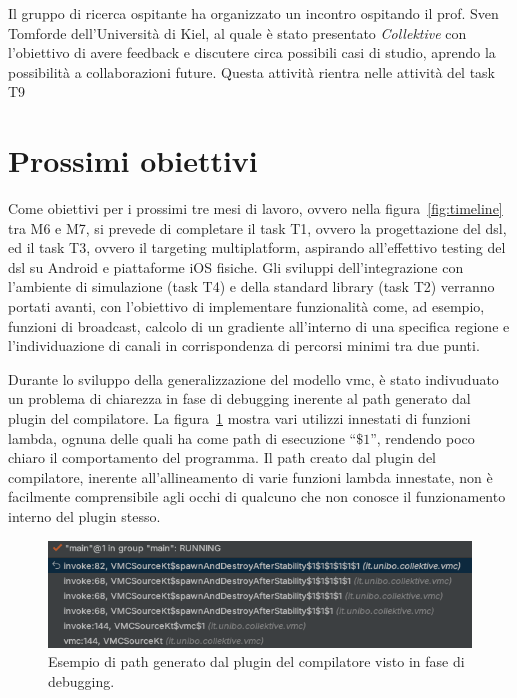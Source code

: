 \documentclass[13pt, a4paper]{article}
\newcommand{\ck}{\emph{Collektive}}
\begin{document}
Il gruppo di ricerca ospitante ha organizzato un incontro ospitando il prof. Sven Tomforde dell'Università di Kiel,
al quale è stato presentato \ck{} con l'obiettivo di avere feedback e discutere circa possibili casi di studio, aprendo la possibilità a collaborazioni future.
%
Questa attività rientra nelle attività del task T9

\section{Prossimi obiettivi}\label{sec:prossimi-obiettivi}

Come obiettivi per i prossimi tre mesi di lavoro, ovvero nella figura~\ref{fig:timeline} tra M6 e M7,
    si prevede di completare il task T1, ovvero la progettazione del \ac{dsl},
    ed il task T3, ovvero il targeting multiplatform,
    aspirando all'effettivo testing del \ac{dsl} su Android e piattaforme iOS fisiche.
%
Gli sviluppi dell'integrazione con l'ambiente di simulazione (task T4) e della standard library (task T2) verranno portati
avanti, con l'obiettivo di implementare funzionalità come, ad esempio, funzioni di broadcast,
calcolo di un gradiente all'interno di una specifica regione e l'individuazione di canali in corrispondenza di percorsi minimi tra due punti.

Durante lo sviluppo della generalizzazione del modello \ac{vmc}, è stato indivuduato un problema di chiarezza in fase di debugging
inerente al path generato dal plugin del compilatore.
%
La figura~\ref{fig:alignment} mostra vari utilizzi innestati di funzioni lambda, ognuna delle quali ha come path di esecuzione
``$\$1$'', rendendo poco chiaro il comportamento del programma.
%
Il path creato dal plugin del compilatore, inerente all'allineamento di varie funzioni lambda innestate, non è facilmente comprensibile
agli occhi di qualcuno che non conosce il funzionamento interno del plugin stesso.
\begin{figure}
    \centering
    \includegraphics[width=\textwidth]{images/alignment}
    \caption{Esempio di path generato dal plugin del compilatore visto in fase di debugging.}
    \label{fig:alignment}
\end{figure}
\end{document}
